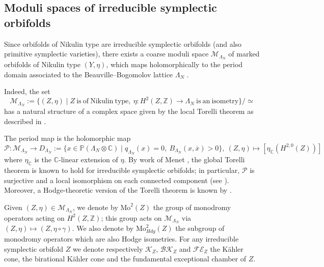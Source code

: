 \documentclass{amsart}
\theoremstyle{definition}
\numberwithin{equation}{section}
\numberwithin{equation}{section} \theoremstyle{definition}
\begin{document}
\subsection{Moduli spaces of irreducible symplectic orbifolds}\label{subsec:moduli-orbifolds}
Since orbifolds of Nikulin type are irreducible symplectic orbifolds (and also primitive symplectic varieties), there exists a coarse moduli space $\mathcal{M}_{\Lambda_N}$ of marked orbifolds of Nikulin type $(Y,\eta)$, which maps holomorphically to the period domain associated to the Beauville--Bogomolov  lattice $\Lambda_N$ \cite{BL, Menet}.

Indeed, the set $$\mathcal{M}_{\Lambda_N}:=\lbrace (Z,\eta)\mid Z\ \mathrm{is\  of\ Nikulin\ type,}\ \eta:H^2(Z,\mathbb{Z})\rightarrow \Lambda_N\ \mathrm{is\ an\ isometry}\rbrace/\simeq$$
has a natural structure of a complex space given by the local Torelli theorem as described in \cite{Menet}.

 The period map is the holomorphic map
\[
\mathcal{P}:\mathcal{M}_{\Lambda_N}\longrightarrow D_{\Lambda_N}:=\{x\in\mathbb{P}(\Lambda_N\otimes \mathbb{C})\mid q_{\Lambda_N}(x)=0,\ B_{\Lambda_N}(x,\overline{x})>0\},\ 
(Z,\eta)\mapsto [\eta_{\mathbb{C}}(H^{2,0}(Z))]
\]
where $\eta_{\mathbb{C}}$ is the $\mathbb{C}$-linear extension of $\eta$.
By work of Menet \cite[Theorem 1.1]{MenetTorelli}, the global Torelli theorem is known to hold for irreducible symplectic orbifolds; in particular, $\mathcal{P}$ is surjective and a local isomorphism on each connected component (see \cite[Proposition 5.8, Theorem 5.9]{MenetTorelli}). Moreover, a Hodge-theoretic version of the Torelli theorem is known by \cite[Theorem 1.1]{MenetRiess}.

Given $(Z,\eta)\in\mathcal{M}_{\Lambda_N}$, we denote by $\mathrm{Mo}^2(Z)$ the group of monodromy operators acting on $H^2(Z,\mathbb{Z})$; this group acts on $\mathcal{M}_{\Lambda_N}$ via $(Z,\eta)\mapsto (Z,\eta\circ\gamma)$. We also denote by $\mathrm{Mo}^2_{Hdg}(Z)$ the subgroup of monodromy operators which are also Hodge isometries. For any irreducible symplectic orbifold $Z$ we denote respectively $\mathcal{K}_Z$, $\mathcal{BK}_Z$ and $\mathcal{FE}_Z$ the K\"ahler cone, the birational K\"ahler cone and the fundamental exceptional chamber of $Z$.
\end{document}
